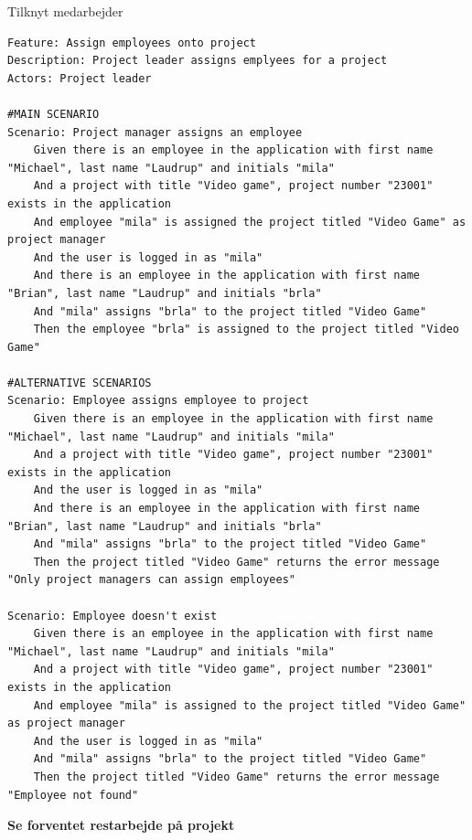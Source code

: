\begin{listing}[H]
    \centering
    \caption{Tilknyt medarbejder}\label{lst:assign_employ}
    \begin{verbatim}
Feature: Assign employees onto project
Description: Project leader assigns emplyees for a project
Actors: Project leader

#MAIN SCENARIO
Scenario: Project manager assigns an employee
    Given there is an employee in the application with first name "Michael", last name "Laudrup" and initials "mila"
    And a project with title "Video game", project number "23001" exists in the application
    And employee "mila" is assigned the project titled "Video Game" as project manager
    And the user is logged in as "mila"
    And there is an employee in the application with first name "Brian", last name "Laudrup" and initials "brla"
    And "mila" assigns "brla" to the project titled "Video Game"
    Then the employee "brla" is assigned to the project titled "Video Game"

#ALTERNATIVE SCENARIOS
Scenario: Employee assigns employee to project
    Given there is an employee in the application with first name "Michael", last name "Laudrup" and initials "mila"
    And a project with title "Video game", project number "23001" exists in the application
    And the user is logged in as "mila"
    And there is an employee in the application with first name "Brian", last name "Laudrup" and initials "brla"
    And "mila" assigns "brla" to the project titled "Video Game"
    Then the project titled "Video Game" returns the error message "Only project managers can assign employees"

Scenario: Employee doesn't exist
    Given there is an employee in the application with first name "Michael", last name "Laudrup" and initials "mila"
    And a project with title "Video game", project number "23001" exists in the application
    And employee "mila" is assigned to the project titled "Video Game" as project manager
    And the user is logged in as "mila"
    And "mila" assigns "brla" to the project titled "Video Game"
    Then the project titled "Video Game" returns the error message "Employee not found"
    \end{verbatim}
\end{listing}
\textbf{Se forventet restarbejde på projekt}

